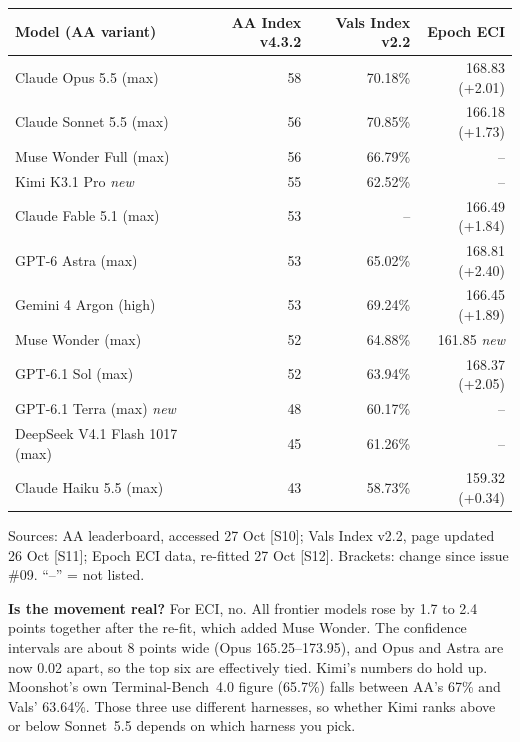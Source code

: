 \documentclass[11pt,a4paper]{article}
\newcommand{\srcref}[1]{\textcolor{brandaccent}{[S#1]}}
\begin{document}
{\small
\begin{tabularx}{\textwidth}{@{}X r r r@{}}
\toprule
\textbf{Model (AA variant)} & \textbf{AA Index v4.3.2} & \textbf{Vals Index v2.2} & \textbf{Epoch ECI} \\
\midrule
Claude Opus 5.5 (max)          & 58 & 70.18\% & 168.83 (+2.01) \\
Claude Sonnet 5.5 (max)        & 56 & 70.85\% & 166.18 (+1.73) \\
Muse Wonder Full (max)         & 56 & 66.79\% & -- \\
Kimi K3.1 Pro \emph{new}       & 55 & 62.52\% & -- \\
Claude Fable 5.1 (max)         & 53 & --      & 166.49 (+1.84) \\
GPT-6 Astra (max)              & 53 & 65.02\% & 168.81 (+2.40) \\
Gemini 4 Argon (high)          & 53 & 69.24\% & 166.45 (+1.89) \\
Muse Wonder (max)              & 52 & 64.88\% & 161.85 \emph{new} \\
GPT-6.1 Sol (max)              & 52 & 63.94\% & 168.37 (+2.05) \\
GPT-6.1 Terra (max) \emph{new} & 48 & 60.17\% & -- \\
DeepSeek V4.1 Flash 1017 (max) & 45 & 61.26\% & -- \\
Claude Haiku 5.5 (max)         & 43 & 58.73\% & 159.32 (+0.34) \\
\bottomrule
\end{tabularx}}
\par\vspace{0.2em}
{\footnotesize\color{brandgrey}Sources: AA leaderboard, accessed 27 Oct \srcref{10}; Vals Index v2.2, page updated 26 Oct \srcref{11};
Epoch ECI data, re-fitted 27 Oct \srcref{12}. Brackets: change since issue \#09. ``--'' = not listed.}
\vspace{0.3em}

\textbf{Is the movement real?} For ECI, no. All frontier models rose by 1.7 to 2.4 points together after the re-fit, which added Muse Wonder.
The confidence intervals are about 8 points wide (Opus 165.25--173.95), and Opus and Astra are now 0.02 apart, so the top six are effectively tied.
Kimi's numbers do hold up. Moonshot's own Terminal-Bench~4.0 figure (65.7\%) falls between AA's 67\% and Vals' 63.64\%. Those three use different harnesses,
so whether Kimi ranks above or below Sonnet~5.5 depends on which harness you pick.
\end{document}
